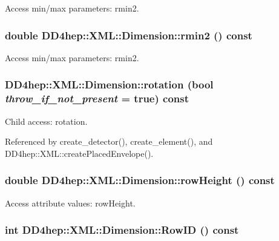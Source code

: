 Access min/max parameters: rmin2. \hypertarget{struct_d_d4hep_1_1_x_m_l_1_1_dimension_ab51c4e3f885463ab6290492752f7d99a}{
\subsubsection[{rmin2}]{\setlength{\rightskip}{0pt plus 5cm}double DD4hep::XML::Dimension::rmin2 () const}}
\label{struct_d_d4hep_1_1_x_m_l_1_1_dimension_ab51c4e3f885463ab6290492752f7d99a}


Access min/max parameters: rmin2. \hypertarget{struct_d_d4hep_1_1_x_m_l_1_1_dimension_a6482cbcea45b29672561a8454383e55c}{
\subsubsection[{rotation}]{ DD4hep::XML::Dimension::rotation (bool {\em throw\_\-if\_\-not\_\-present} = {\ttfamily true}) const}}
\label{struct_d_d4hep_1_1_x_m_l_1_1_dimension_a6482cbcea45b29672561a8454383e55c}


Child access: rotation. 

Referenced by create\_\-detector(), create\_\-element(), and DD4hep::XML::createPlacedEnvelope().\hypertarget{struct_d_d4hep_1_1_x_m_l_1_1_dimension_a4a4d36baaccaaebbcee82cb336b02a89}{
\subsubsection[{rowHeight}]{\setlength{\rightskip}{0pt plus 5cm}double DD4hep::XML::Dimension::rowHeight () const}}
\label{struct_d_d4hep_1_1_x_m_l_1_1_dimension_a4a4d36baaccaaebbcee82cb336b02a89}


Access attribute values: rowHeight. \hypertarget{struct_d_d4hep_1_1_x_m_l_1_1_dimension_a94f92d7cc65da148b3cf7e1b0bef949e}{
\subsubsection[{RowID}]{\setlength{\rightskip}{0pt plus 5cm}int DD4hep::XML::Dimension::RowID () const}}
\label{struct_d_d4hep_1_1_x_m_l_1_1_dimension_a94f92d7cc65da148b3cf7e1b0bef949e}


